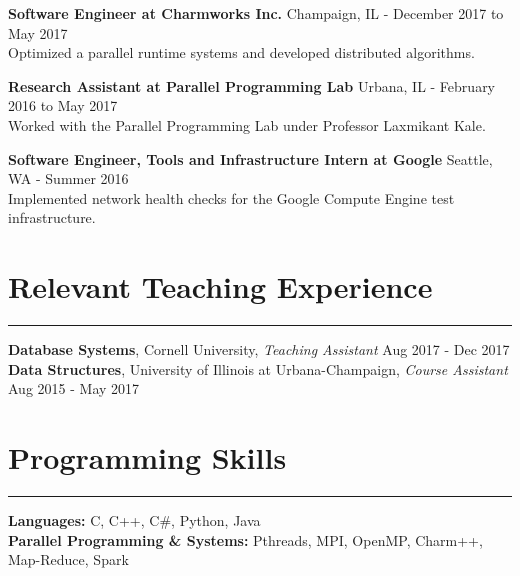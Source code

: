 \documentclass[10pt]{article}
\newcommand{\leftrightrow}[2]{
	#1 \hfill #2 \\
}
\newcommand{\teachblock}[2]{
	\leftrightrow{#1}{#2}
}
\newcommand{\workblock}[3]{
	\leftrightrow{\textbf{#1}}{#2}
    #3 \\
}
\begin{document}
\vspace{-0.8em}

\workblock{Software Engineer at Charmworks Inc.}{Champaign, IL - December 2017 to May 2017}{Optimized a parallel
runtime systems and developed distributed algorithms. } 

\vspace{-0.8em}

\workblock{Research Assistant at Parallel Programming Lab}{Urbana, IL - February 2016 to May 2017}{Worked with the Parallel Programming Lab under Professor Laxmikant Kale.}

\vspace{-0.8em}

\workblock{Software Engineer, Tools and Infrastructure Intern at Google} {Seattle, WA - Summer 2016}{Implemented network health checks for the Google Compute Engine test infrastructure.}

\vspace{-0.8em}

\section{Relevant Teaching Experience}
\hrule \vspace{0.4em}
\teachblock{\textbf{Database Systems}, Cornell University, \textit{Teaching Assistant}}{Aug 2017 - Dec 2017}
\teachblock{\textbf{Data Structures}, University of Illinois at Urbana-Champaign, \textit{Course Assistant}}{Aug 2015 - May 2017}

\vspace{-0.8em}

\section{Programming Skills}
\hrule \vspace{0.4em}
\textbf{Languages:} C, C++, C\#, Python, Java \\
\textbf{Parallel Programming \& Systems:} Pthreads, MPI, OpenMP, Charm++, Map-Reduce, Spark
\end{document}
